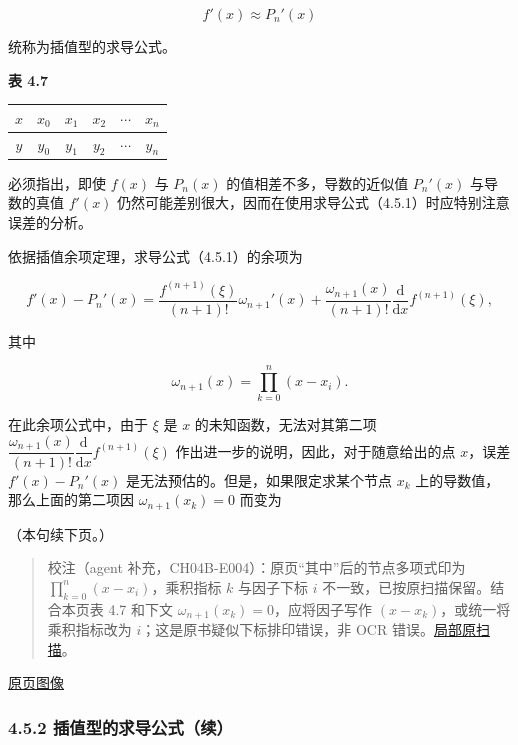\documentclass[
  10pt,
  fontset=fandol]{ctexart}
\newcounter{none} %
\begin{document}
\[
f'(x)\approx P_n'(x)
\tag{4.5.1}
\]

统称为插值型的求导公式。

\textbf{表 4.7}

{\def\LTcaptype{none} %
\begin{longtable}[]{@{}cccccc@{}}
\toprule\noalign{}
\(x\) & \(x_0\) & \(x_1\) & \(x_2\) & \(\cdots\) & \(x_n\) \\
\midrule\noalign{}
\endhead
\bottomrule\noalign{}
\endlastfoot
\(y\) & \(y_0\) & \(y_1\) & \(y_2\) & \(\cdots\) & \(y_n\) \\
\end{longtable}
}

必须指出，即使 \(f(x)\) 与 \(P_n(x)\) 的值相差不多，导数的近似值 \(P_n'(x)\) 与导数的真值 \(f'(x)\) 仍然可能差别很大，因而在使用求导公式（4.5.1）时应特别注意误差的分析。

依据插值余项定理，求导公式（4.5.1）的余项为

\[
f'(x)-P_n'(x)=\frac{f^{(n+1)}(\xi)}{(n+1)!}\omega_{n+1}'(x)
+\frac{\omega_{n+1}(x)}{(n+1)!}\frac{\mathrm{d}}{\mathrm{d}x}f^{(n+1)}(\xi),
\]

其中

\[
\omega_{n+1}(x)=\prod_{k=0}^{n}(x-x_i).
\]

在此余项公式中，由于 \(\xi\) 是 \(x\) 的未知函数，无法对其第二项 \(\dfrac{\omega_{n+1}(x)}{(n+1)!}\dfrac{\mathrm{d}}{\mathrm{d}x}f^{(n+1)}(\xi)\) 作出进一步的说明，因此，对于随意给出的点 \(x\)，误差 \(f'(x)-P_n'(x)\) 是无法预估的。但是，如果限定求某个节点 \(x_k\) 上的导数值，那么上面的第二项因 \(\omega_{n+1}(x_k)=0\) 而变为

（本句续下页。）

\begin{quote}
校注（agent 补充，CH04B-E004）：原页``其中''后的节点多项式印为 \(\prod_{k=0}^{n}(x-x_i)\)，乘积指标 \(k\) 与因子下标 \(i\) 不一致，已按原扫描保留。结合本页表 4.7 和下文 \(\omega_{n+1}(x_k)=0\)，应将因子写作 \((x-x_k)\)，或统一将乘积指标改为 \(i\)；这是原书疑似下标排印错误，非 OCR 错误。\href{../assets/ch04b/review-p113-product.png}{局部原扫描}。
\end{quote}

\href{../../source-images/pdf-114.jpeg}{原页图像}

\subsubsection{4.5.2 插值型的求导公式（续）}\label{ux63d2ux503cux578bux7684ux6c42ux5bfcux516cux5f0fux7eed}
\end{document}
